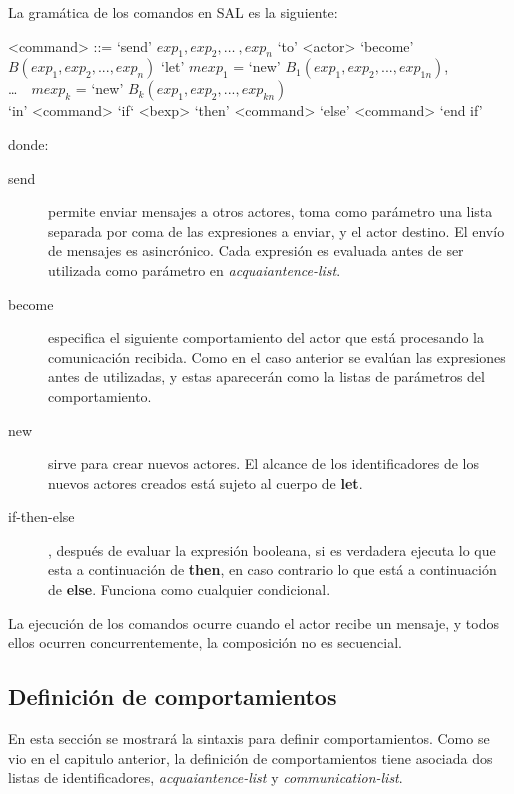 La gramática de los comandos en SAL es la siguiente:

\begin{grammar}
  <command> ::= `send' $exp_1, exp_2, \ldots\ , exp_n$ `to' <actor>  
  \alt `become' $B(exp_1, exp_2, ..., exp_n)$
  \alt `let' $mexp_1$ = `new' $B_1(exp_1, exp_2, ..., exp_{1n})$, \\
   \ldots\ \ $mexp_k$ = `new' $B_k(exp_1, exp_2, ..., exp_{kn})$   \\
  `in' <command> 
  \alt `if` <bexp> `then' <command> `else' <command> `end if'
\end{grammar}

donde:

\begin{description}
\item [send] permite enviar mensajes a otros actores, toma como parámetro una lista separada por coma de las expresiones a enviar, y el actor destino. El envío de mensajes es asincrónico. Cada expresión es evaluada antes de ser utilizada como parámetro en \textit{acquaiantence-list}.
\item [become] especifica el siguiente comportamiento del actor que está procesando la comunicación recibida. Como en el caso anterior se evalúan las expresiones antes de utilizadas, y estas aparecerán como la listas de parámetros del comportamiento. 
\item [new] sirve para crear nuevos actores. El alcance de los
  identificadores de los nuevos actores creados está sujeto al cuerpo de \textbf{let}.
\item [if-then-else], después de evaluar la expresión booleana, si es verdadera
  ejecuta lo que esta a continuación de \textbf{then}, en caso contrario lo que está a
  continuación de \textbf{else}. Funciona como cualquier condicional.
\end{description}

La ejecución de los comandos ocurre cuando el actor recibe un mensaje, y todos
ellos ocurren concurrentemente, la composición no es secuencial.

\subsection{Definición de comportamientos}

En esta sección se mostrará la sintaxis para definir comportamientos. Como se vio en el capitulo anterior, la definición de comportamientos tiene asociada dos listas de identificadores, \textit{acquaiantence-list} y \textit{communication-list}. 

